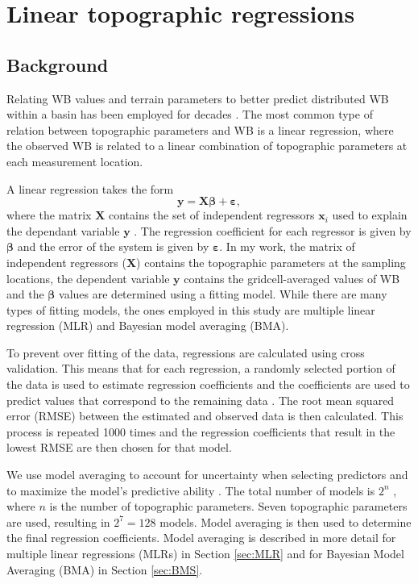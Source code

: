 \documentclass{sfuthesis}
\renewcommand{\vector}[1]{\mathbf{#1}}
\begin{document}
\section{Linear topographic regressions}
\label{sec:linearregression}

\subsection{Background}
Relating WB values and terrain parameters to better predict distributed WB within a basin has been employed for decades \citep[e.g.][]{Woo1978, Molotch2005, McGrath2015}. The most common type of relation between topographic parameters and WB is a linear regression, where the observed WB is related to a linear combination of topographic parameters at each measurement location. 

A linear regression takes the form
\begin{equation}
\vector{y} = \vector{X} \bm{\beta} + \bm{\varepsilon},
\end{equation}
where the matrix $\vector{X}$ contains the set of independent regressors $\vector{x}_i$ used to explain the dependant variable $\vector{y}$ \citep[e.g.][]{Davis1986}. The regression coefficient for each regressor is given by $\bm{\beta}$ and the error of the system is given by $\bm{\varepsilon}$. In my work, the matrix of independent regressors ($\vector{X}$) contains the topographic parameters at the sampling locations, the dependent variable $\vector{y}$ contains the gridcell-averaged values of WB and the $\bm{\beta}$ values are determined using a fitting model. While there are many types of fitting models, the ones employed in this study are multiple linear regression (MLR) and Bayesian model averaging (BMA).

To prevent over fitting of the data, regressions are calculated using cross validation. This means that for each regression, a randomly selected portion of the data is used to estimate regression coefficients and the coefficients are used to predict values that correspond to the remaining data \citep{Kohavi1995}. The root mean squared error (RMSE) between the estimated and observed data is then calculated. This process is repeated 1000 times and the regression coefficients that result in the lowest RMSE are then chosen for that model. 

We use model averaging to account for uncertainty when selecting predictors and to maximize the model's predictive ability \citep{Madigan1994}. The total number of models is $2^n$ , where $n$ is the number of topographic parameters. Seven topographic parameters are used, resulting in $2^7 = 128$ models. Model averaging is then used to determine the final regression coefficients. Model averaging is described in more detail for multiple linear regressions (MLRs) in Section \ref{sec:MLR} and for Bayesian Model Averaging (BMA) in Section \ref{sec:BMS}.
\end{document}
